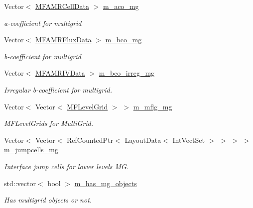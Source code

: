 \begin{DoxyCompactItemize}
Vector$<$ \hyperlink{type__definitions_8H_aced885351d40daa466564acbee4042d3}{M\+F\+A\+M\+R\+Cell\+Data} $>$ \hyperlink{classmfconductivityopfactory_a34442483f0fbafd7e2fda7a03cf2fd35}{m\+\_\+aco\+\_\+mg}
\begin{DoxyCompactList}\small\item\em a-\/coefficient for multigrid \end{DoxyCompactList}\item 
Vector$<$ \hyperlink{type__definitions_8H_a4033d82364b7e6655b58257749d7881f}{M\+F\+A\+M\+R\+Flux\+Data} $>$ \hyperlink{classmfconductivityopfactory_a4687ec93934cc9c0e1c7883b3aab9a68}{m\+\_\+bco\+\_\+mg}
\begin{DoxyCompactList}\small\item\em b-\/coefficient for multigrid \end{DoxyCompactList}\item 
Vector$<$ \hyperlink{type__definitions_8H_a559707b00625e419df1a59d9501220de}{M\+F\+A\+M\+R\+I\+V\+Data} $>$ \hyperlink{classmfconductivityopfactory_ab80af617da60384bc71be441600973e7}{m\+\_\+bco\+\_\+irreg\+\_\+mg}
\begin{DoxyCompactList}\small\item\em Irregular b-\/coefficient for multigrid. \end{DoxyCompactList}\item 
Vector$<$ Vector$<$ \hyperlink{classMFLevelGrid}{M\+F\+Level\+Grid} $>$ $>$ \hyperlink{classmfconductivityopfactory_ad9401618c67c2706dc9c564ba608cc27}{m\+\_\+mflg\+\_\+mg}
\begin{DoxyCompactList}\small\item\em M\+F\+Level\+Grids for Multi\+Grid. \end{DoxyCompactList}\item 
Vector$<$ Vector$<$ Ref\+Counted\+Ptr$<$ Layout\+Data$<$ Int\+Vect\+Set $>$ $>$ $>$ $>$ \hyperlink{classmfconductivityopfactory_ac9aae38ad35d66ac066694de865d8909}{m\+\_\+jumpcells\+\_\+mg}
\begin{DoxyCompactList}\small\item\em Interface jump cells for lower levels MG. \end{DoxyCompactList}\item 
std\+::vector$<$ bool $>$ \hyperlink{classmfconductivityopfactory_a75240127a9d960617bf12b9fa9ce2d30}{m\+\_\+has\+\_\+mg\+\_\+objects}
\begin{DoxyCompactList}\small\item\em Has multigrid objects or not. \end{DoxyCompactList}\item 

\end{DoxyCompactItemize}
